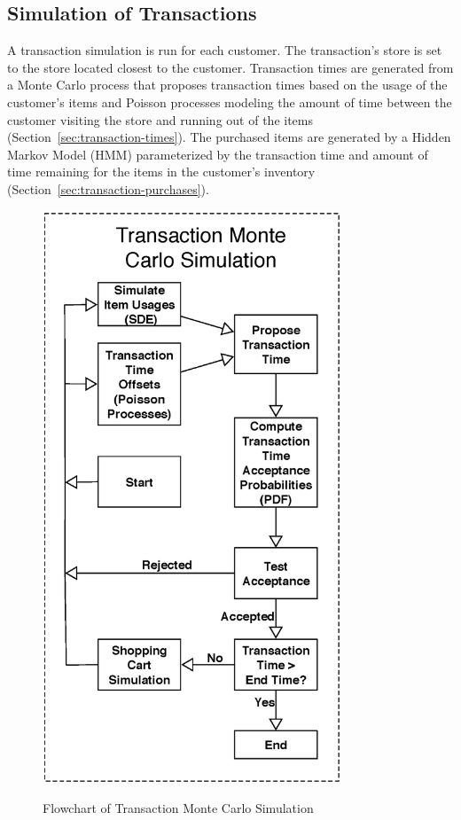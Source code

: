 \subsection{Simulation of Transactions}
A transaction simulation is run for each customer. The transaction's store is set to the store located closest to the customer.  Transaction times are generated from a Monte Carlo process that proposes transaction times based on the usage of the customer's items and Poisson processes modeling the amount of time between the customer visiting the store and running out of the items (Section~\ref{sec:transaction-times}).  The purchased items are generated by a Hidden Markov Model (HMM) parameterized by the transaction time and amount of time remaining for the items in the customer's inventory (Section~\ref{sec:transaction-purchases}).

\begin{figure}[!t]
  \centering
  \caption{Flowchart of Transaction Monte Carlo Simulation}
  \includegraphics[width=3.5in]{figures/bigpetstore/transaction_simulation.eps}
  \label{fig:trans_sim}
\end{figure}

